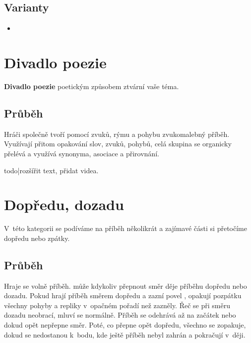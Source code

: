 \subsection{ Varianty } \begin{itemize}
\item {}
\end{itemize}
 
 
 
 
 
\needspace{5cm} \section{Divadlo poezie} \label{divadlo poezie}  
 
 
\textbf{Divadlo poezie} poetickým způsobem ztvární vaše téma. 
 
 
\subsection{Průběh} Hráči společně tvoří pomocí zvuků, rýmu a pohybu zvukomalebný příběh. 
Využívají přitom opakování slov, zvuků, pohybů, celá skupina se organicky přelévá a využívá synonyma, asociace a přirovnání. 
 
{{todo|rozšířit text, přidat videa.}} 
 
 
 
 
 
\needspace{5cm} \section{Dopředu, dozadu} \label{dopředu, dozadu}  
 
V~této kategorii se podíváme na příběh několikrát a zajímavé části si přetočíme dopředu nebo zpátky. 
 
\subsection{ Průběh } Hraje se volně příběh.  může kdykoliv přepnout směr děje příběhu dopředu nebo dozadu. Pokud  hrají příběh směrem dopředu a zazní povel  , opakují pozpátku všechny pohyby a repliky v~opačném pořadí než zazněly. Řeč se při směru dozadu neobrací, mluví se normálně. Příběh se odehrává až na začátek nebo dokud  opět nepřepne směr. Poté, co  přepne opět dopředu, všechno se zopakuje, dokud se  nedostanou k~bodu, kde ještě příběh nebyl zahrán a pokračují v~ději. 
 
